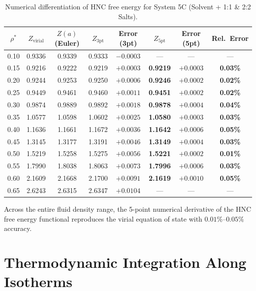 \documentclass[11pt,a4paper]{article}
\begin{document}
\begin{table}[htbp]
\centering
\caption{Numerical differentiation of HNC free energy for System 5C (Solvent + 1:1 \& 2:2 Salts).}
\label{tab:diff_5c}
\small
\begin{tabular}{cccccccc}
\toprule
$\rho^*$ & $Z_{\text{virial}}$ & $Z(a)$ (Euler) & $Z_{\text{3pt}}$ & Error (3pt) & $Z_{\text{5pt}}$ & Error (5pt) & Rel.~Error \\
\midrule
0.10 & 0.9336 & 0.9339 & 0.9333 & $-0.0003$ & — & — & — \\
0.15 & 0.9216 & 0.9222 & 0.9219 & $+0.0003$ & \textbf{0.9219} & $+0.0003$ & \textbf{0.03\%} \\
0.20 & 0.9244 & 0.9253 & 0.9250 & $+0.0006$ & \textbf{0.9246} & $+0.0002$ & \textbf{0.02\%} \\
0.25 & 0.9449 & 0.9461 & 0.9460 & $+0.0011$ & \textbf{0.9451} & $+0.0002$ & \textbf{0.02\%} \\
0.30 & 0.9874 & 0.9889 & 0.9892 & $+0.0018$ & \textbf{0.9878} & $+0.0004$ & \textbf{0.04\%} \\
0.35 & 1.0577 & 1.0598 & 1.0602 & $+0.0025$ & \textbf{1.0580} & $+0.0003$ & \textbf{0.03\%} \\
0.40 & 1.1636 & 1.1661 & 1.1672 & $+0.0036$ & \textbf{1.1642} & $+0.0006$ & \textbf{0.05\%} \\
0.45 & 1.3145 & 1.3177 & 1.3191 & $+0.0046$ & \textbf{1.3149} & $+0.0004$ & \textbf{0.03\%} \\
0.50 & 1.5219 & 1.5258 & 1.5275 & $+0.0056$ & \textbf{1.5221} & $+0.0002$ & \textbf{0.01\%} \\
0.55 & 1.7990 & 1.8038 & 1.8063 & $+0.0073$ & \textbf{1.7996} & $+0.0006$ & \textbf{0.03\%} \\
0.60 & 2.1609 & 2.1668 & 2.1700 & $+0.0091$ & \textbf{2.1619} & $+0.0010$ & \textbf{0.05\%} \\
0.65 & 2.6243 & 2.6315 & 2.6347 & $+0.0104$ & — & — & — \\
\bottomrule
\end{tabular}
\end{table}

Across the entire fluid density range, the 5-point numerical derivative of the HNC free energy functional reproduces the virial equation of state with $0.01\%$--$0.05\%$ accuracy.


\section{Thermodynamic Integration Along Isotherms}
\end{document}
